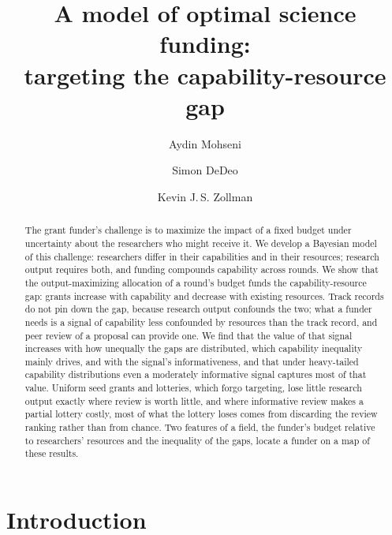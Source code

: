 \documentclass[article, 11pt, reqno]{amsart}
\title[A model of optimal science funding]{A model of optimal science funding:\\ targeting the capability-resource gap}
\author{Aydin Mohseni}
\author{Simon DeDeo}
\author{Kevin J.\,S. Zollman}
\theoremstyle{named}
\begin{document}
\begin{abstract}
The grant funder's challenge is to maximize the impact of a fixed budget under uncertainty about the researchers who might receive it. We develop a Bayesian model of this challenge: researchers differ in their capabilities and in their resources; research output requires both, and funding compounds capability across rounds. We show that the output-maximizing allocation of a round's budget funds the capability-resource gap: grants increase with capability and decrease with existing resources. Track records do not pin down the gap, because research output confounds the two; what a funder needs is a signal of capability less confounded by resources than the track record, and peer review of a proposal can provide one. We find that the value of that signal increases with how unequally the gaps are distributed, which capability inequality mainly drives, and with the signal's informativeness, and that under heavy-tailed capability distributions even a moderately informative signal captures most of that value. Uniform seed grants and lotteries, which forgo targeting, lose little research output exactly where review is worth little, and where informative review makes a partial lottery costly, most of what the lottery loses comes from discarding the review ranking rather than from chance. Two features of a field, the funder's budget relative to researchers' resources and the inequality of the gaps, locate a funder on a map of these results.
\end{abstract}

\maketitle

\section{Introduction}\label{sec:intro}
\end{document}
